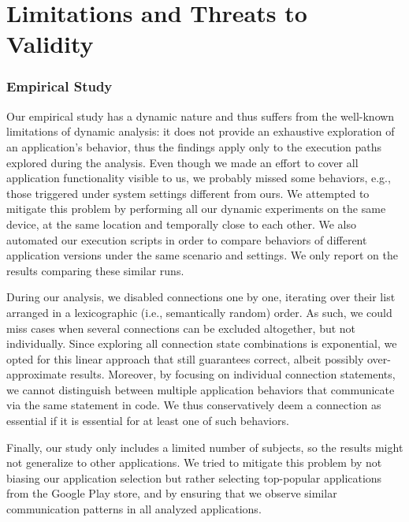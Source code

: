 \vspace{0.05in}
\section{Limitations and Threats to \\Validity}
\label{sec:limitations}

\subsubsection{Empirical Study}
Our empirical study has a dynamic nature and thus suffers from the well-known limitations of dynamic analysis: it does not provide an exhaustive exploration of an application's behavior, thus the findings apply only to the execution paths explored during the analysis. 
Even though we made an effort to cover all application functionality visible to us, we probably missed some behaviors, e.g., those triggered under system settings different from ours. 
We attempted to mitigate this problem by performing all our dynamic experiments on the same device, at the same location and temporally close to each other.  
We also automated our execution scripts in order to compare behaviors of different application versions under the same scenario and settings. 
We only report on the results comparing these similar runs.  

During our analysis, we disabled connections one by one, iterating over their list arranged in a lexicographic (i.e., semantically random) order. As such, we could miss cases when 
several connections can be excluded altogether, but not individually. 
Since exploring all connection state combinations is exponential, we opted for this linear approach that still guarantees correct, 
albeit possibly over-approximate results. Moreover, by focusing on individual connection statements, we cannot distinguish between multiple application behaviors
that communicate via the same statement in code. We thus conservatively deem a connection as essential if it is essential for at least one of such behaviors. 
 
Finally, our study only includes a limited number of subjects, so the results might not generalize to other applications.
We tried to mitigate this problem by not biasing our application selection but rather selecting top-popular applications from the Google Play store, and by ensuring that we observe similar communication patterns in all analyzed applications.

